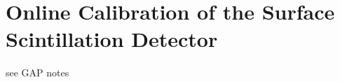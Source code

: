 
\chapter{Online Calibration of the Surface Scintillation Detector}
\label{chap:ssd-online-calibration}

see GAP notes
